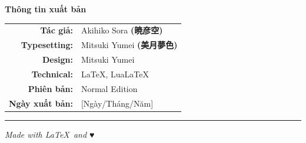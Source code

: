 \begin{center}

{\Large\titlefont\textbf{Thông tin xuất bản}}

\vspace{2cm}

\begin{tabular}{rl}
\textbf{Tác giả:} & Akihiko Sora {\japanesefont\textbf{(暁彦空)}} \\[0.5em]
\textbf{Typesetting:} & Mitsuki Yumei {\japanesefont\textbf{(美月夢色)}} \\[0.5em]
\textbf{Design:} & Mitsuki Yumei \\[0.5em]
\textbf{Technical:} & LaTeX, LuaLaTeX \\[0.5em]
\textbf{Phiên bản:} & Normal Edition \\[0.5em]
\textbf{Ngày xuất bản:} & [Ngày/Tháng/Năm] \\[0.5em]
\end{tabular}

\vspace{2cm}

\textcolor{bunko_gray}{\rule{5cm}{0.4pt}}

\vspace{1cm}

\small
\textit{Made with \LaTeX\ and ♥}

\end{center}

\clearpage
\thispagestyle{empty}


\vspace*{2cm}

